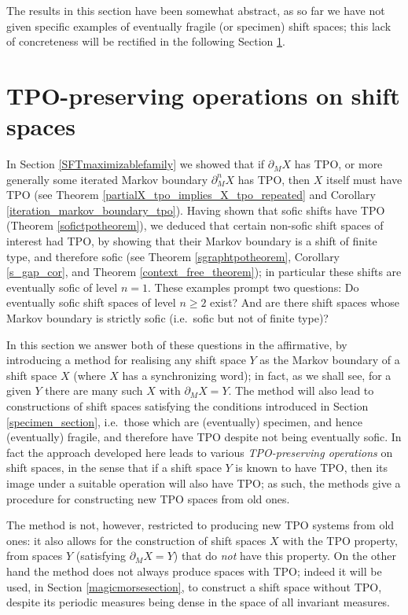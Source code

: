 \documentclass[reqno,11pt]{amsart}
\theoremstyle{definition}
\theoremstyle{remark}
\theoremstyle{remark}
\numberwithin{equation}{section}
\begin{document}
The results in this section have been somewhat abstract, as so far we have not given specific examples of
eventually fragile (or specimen) shift spaces; this lack of concreteness will be rectified in the following 
Section \ref{TPO_preserving}.





\section{TPO-preserving operations on shift spaces}\label{TPO_preserving}

In Section \ref{SFTmaximizablefamily} we showed that if $\partial_M X$ has TPO, or more generally some iterated Markov boundary $\partial_M^n X$ has TPO, then $X$ itself must have TPO (see Theorem \ref{partialX_tpo_implies_X_tpo_repeated}
and Corollary \ref{iteration_markov_boundary_tpo}).
Having shown that sofic shifts have TPO (Theorem \ref{sofictpotheorem}), we deduced that certain non-sofic shift spaces of interest had TPO, by showing that their Markov boundary is a shift of finite type, and therefore sofic
(see Theorem \ref{sgraphtpotheorem}, Corollary \ref{s_gap_cor}, and Theorem \ref{context_free_theorem}); in particular these shifts are eventually sofic of level $n=1$.
These examples prompt two questions: Do eventually sofic shift spaces of level $n\ge 2$ exist?  And are there shift spaces whose Markov boundary is strictly sofic (i.e.~sofic but not of finite type)?

In this section we answer both of these questions in the affirmative, by introducing a method for realising any shift space $Y$ as the Markov boundary of a shift space $X$ (where $X$ has a synchronizing word); in fact, as we shall see, for a given $Y$ there are many such $X$ with $\partial_M X=Y$.
The method will also lead to constructions of shift spaces satisfying the conditions 
introduced in Section \ref{specimen_section}, i.e.~those which are (eventually) specimen, and hence (eventually) fragile, and therefore have TPO despite not being eventually sofic.
In fact the approach developed here leads to various \emph{TPO-preserving operations} on shift spaces,
in the sense that if a shift space $Y$ is known to have TPO, then its image under a suitable operation will also have TPO;
as such, the methods give a procedure for constructing new TPO spaces from old ones.

The method is not, however, restricted to producing new TPO systems from old ones: it also allows for the construction of shift spaces $X$ with the TPO property, from spaces $Y$ (satisfying $\partial_M X=Y$) that do \emph{not} have this property. 
On the other hand the method
does not always produce spaces with TPO; indeed it 
will be used, in Section \ref{magicmorsesection}, to construct a shift space without TPO, despite
its periodic measures being dense in the space of all invariant measures.
\end{document}
